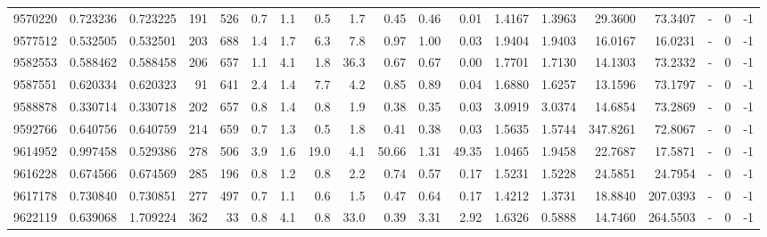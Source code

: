 \begin{tabular}{rrrrrrrrrrrrrrrrlrr}
   9570220 & 0.723236 &   0.723225 &  191 &  526 &      0.7 &      1.1 &     0.5 &      1.7 &       0.45 &        0.46 &        0.01 &  1.4167 &  1.3963 &   29.3600 &   73.3407 &             - &        0 &         -1 \\
   9577512 & 0.532505 &   0.532501 &  203 &  688 &      1.4 &      1.7 &     6.3 &      7.8 &       0.97 &        1.00 &        0.03 &  1.9404 &  1.9403 &   16.0167 &   16.0231 &             - &        0 &         -1 \\
   9582553 & 0.588462 &   0.588458 &  206 &  657 &      1.1 &      4.1 &     1.8 &     36.3 &       0.67 &        0.67 &        0.00 &  1.7701 &  1.7130 &   14.1303 &   73.2332 &             - &        0 &         -1 \\
   9587551 & 0.620334 &   0.620323 &   91 &  641 &      2.4 &      1.4 &     7.7 &      4.2 &       0.85 &        0.89 &        0.04 &  1.6880 &  1.6257 &   13.1596 &   73.1797 &             - &        0 &         -1 \\
   9588878 & 0.330714 &   0.330718 &  202 &  657 &      0.8 &      1.4 &     0.8 &      1.9 &       0.38 &        0.35 &        0.03 &  3.0919 &  3.0374 &   14.6854 &   73.2869 &             - &        0 &         -1 \\
   9592766 & 0.640756 &   0.640759 &  214 &  659 &      0.7 &      1.3 &     0.5 &      1.8 &       0.41 &        0.38 &        0.03 &  1.5635 &  1.5744 &  347.8261 &   72.8067 &             - &        0 &         -1 \\
   9614952 & 0.997458 &   0.529386 &  278 &  506 &      3.9 &      1.6 &    19.0 &      4.1 &      50.66 &        1.31 &       49.35 &  1.0465 &  1.9458 &   22.7687 &   17.5871 &             - &        0 &         -1 \\
   9616228 & 0.674566 &   0.674569 &  285 &  196 &      0.8 &      1.2 &     0.8 &      2.2 &       0.74 &        0.57 &        0.17 &  1.5231 &  1.5228 &   24.5851 &   24.7954 &             - &        0 &         -1 \\
   9617178 & 0.730840 &   0.730851 &  277 &  497 &      0.7 &      1.1 &     0.6 &      1.5 &       0.47 &        0.64 &        0.17 &  1.4212 &  1.3731 &   18.8840 &  207.0393 &             - &        0 &         -1 \\
   9622119 & 0.639068 &   1.709224 &  362 &   33 &      0.8 &      4.1 &     0.8 &     33.0 &       0.39 &        3.31 &        2.92 &  1.6326 &  0.5888 &   14.7460 &  264.5503 &             - &        0 &         -1 \\

\end{tabular}
